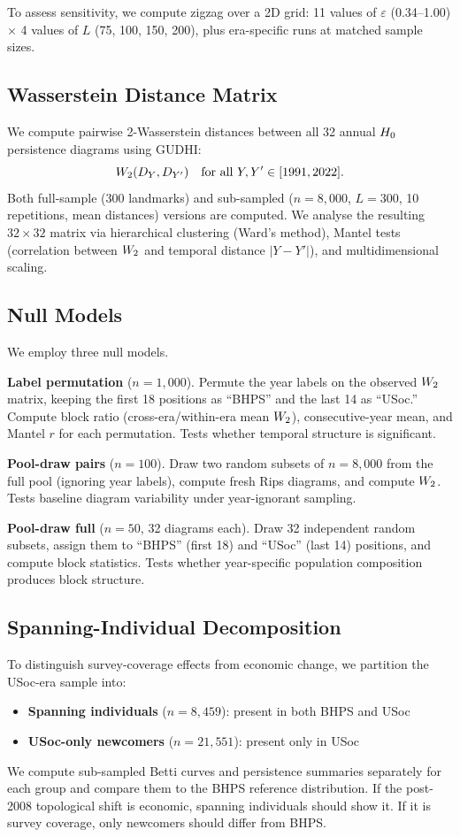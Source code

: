 To assess sensitivity, we compute zigzag over a 2D grid: 11 values of
$\varepsilon$ (0.34--1.00) $\times$ 4 values of $L$ (75, 100, 150, 200), plus
era-specific runs at matched sample sizes.

\subsection{Wasserstein Distance Matrix}

We compute pairwise 2-Wasserstein distances between all 32 annual $H_{0}$
persistence diagrams using GUDHI:
\[
  W_2(D_Y, D_{Y'}) \quad \text{for all } Y, Y' \in [1991, 2022].
\]
Both full-sample (300 landmarks) and sub-sampled ($n = 8{,}000$, $L = 300$, 10
repetitions, mean distances) versions are computed.
We analyse the resulting $32 \times 32$ matrix via hierarchical clustering
(Ward's method), Mantel tests (correlation between $W_2$ and temporal distance
$|Y - Y'|$), and multidimensional scaling.

\subsection{Null Models}

We employ three null models.

\textbf{Label permutation} ($n = 1{,}000$).
Permute the year labels on the observed $W_2$ matrix, keeping the first 18
positions as ``BHPS'' and the last 14 as ``USoc.''
Compute block ratio (cross-era/within-era mean $W_2$), consecutive-year mean,
and Mantel $r$ for each permutation.
Tests whether temporal structure is significant.

\textbf{Pool-draw pairs} ($n = 100$).
Draw two random subsets of $n = 8{,}000$ from the full pool (ignoring year
labels), compute fresh Rips diagrams, and compute $W_2$.
Tests baseline diagram variability under year-ignorant sampling.

\textbf{Pool-draw full} ($n = 50$, 32 diagrams each).
Draw 32 independent random subsets, assign them to ``BHPS'' (first 18) and
``USoc'' (last 14) positions, and compute block statistics.
Tests whether year-specific population composition produces block structure.

\subsection{Spanning-Individual Decomposition}

To distinguish survey-coverage effects from economic change, we partition the
USoc-era sample into:
\begin{itemize}
  \item \textbf{Spanning individuals} ($n = 8{,}459$): present in both BHPS and
    USoc
  \item \textbf{USoc-only newcomers} ($n = 21{,}551$): present only in USoc
\end{itemize}
We compute sub-sampled Betti curves and persistence summaries separately for each
group and compare them to the BHPS reference distribution.
If the post-2008 topological shift is economic, spanning individuals should show
it.
If it is survey coverage, only newcomers should differ from BHPS.

